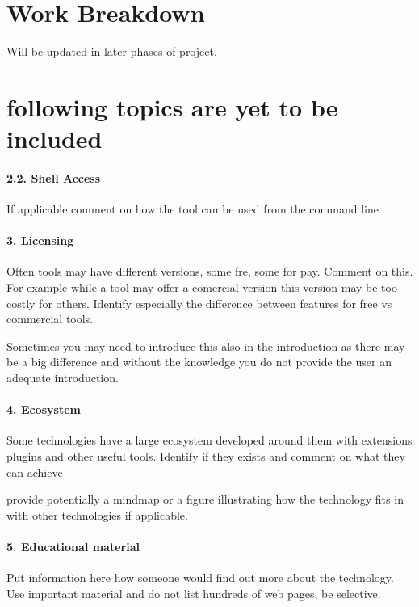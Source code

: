 \documentclass[9pt,twocolumn,twoside]{../../styles/osajnl}
\begin{document}
\appendix
\section{Work Breakdown}
Will be updated in later phases of project.
\section{following topics are yet to be included}
\paragraph{2.2. Shell Access}
If applicable comment on how the tool can be used from the command
line
\paragraph{3. Licensing}
Often tools may have different versions, some fre, some for
pay. Comment on this. For example while a tool may offer a comercial
version this version may be too costly for others. Identify especially
the difference between features for free vs commercial tools.

Sometimes you may need to introduce this also in the introduction as
there may be a big difference and without the knowledge you do not
provide the user an adequate introduction.

\paragraph{4. Ecosystem}

Some technologies have a large ecosystem developed around them with
extensions plugins and other useful tools. Identify if they exists and
comment on what they can achieve

provide potentially a mindmap or a figure illustrating how the
technology fits in with other technologies if applicable.


\paragraph{5. Educational material}

Put information here how someone would find out more about the
technology. Use important material and do not list hundreds of web
pages, be selective.
\end{document}
